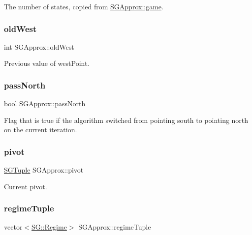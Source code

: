 The number of states, copied from \hyperlink{classSGApprox_a0774e3ed0ff009809606a42c9e7ef727}{S\+G\+Approx\+::game}. \mbox{\label{classSGApprox_a130b9dc6e354a70a0f3cf08c5a511c99}} 
\subsubsection{\texorpdfstring{old\+West}{oldWest}}
{\footnotesize\ttfamily int S\+G\+Approx\+::old\+West\hspace{0.3cm}{\ttfamily [private]}}

Previous value of west\+Point. \mbox{\label{classSGApprox_aec0377b26f0efaea314f72554a8862b9}} 
\subsubsection{\texorpdfstring{pass\+North}{passNorth}}
{\footnotesize\ttfamily bool S\+G\+Approx\+::pass\+North\hspace{0.3cm}{\ttfamily [private]}}

Flag that is true if the algorithm switched from pointing south to pointing north on the current iteration. \mbox{\label{classSGApprox_a037c73ff2b6ff8a55fadf57bb0a6a546}} 
\subsubsection{\texorpdfstring{pivot}{pivot}}
{\footnotesize\ttfamily \hyperlink{classSGTuple}{S\+G\+Tuple} S\+G\+Approx\+::pivot\hspace{0.3cm}{\ttfamily [private]}}

Current pivot. \mbox{\label{classSGApprox_a01f7878f807a2143ce4a7b64bf3cc110}} 
\subsubsection{\texorpdfstring{regime\+Tuple}{regimeTuple}}
{\footnotesize\ttfamily vector$<$\hyperlink{namespaceSG_a139e4dec41ea0f38aae1f93f60cfff60}{S\+G\+::\+Regime}$>$ S\+G\+Approx\+::regime\+Tuple\hspace{0.3cm}{\ttfamily [private]}}

